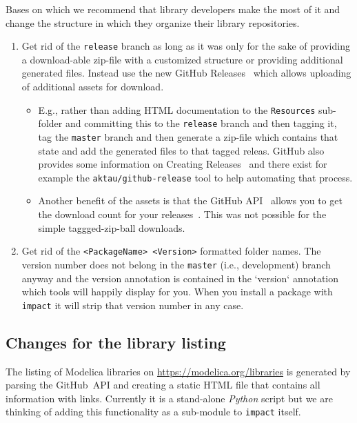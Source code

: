 \documentclass[11pt,a4paper,twocolumn]{article}
\newcommand{\code}[1]{\texttt{#1}} %
\begin{document}
Bases on which we recommend that library developers make the most of
it and change the structure in which they organize their library repositories.
\begin{enumerate}
\item Get rid of the \texttt{release} branch as long as it was only
  for the sake of providing a download-able zip-file with a customized
  structure or providing additional generated files.
  Instead use the new GitHub Releases~\parencite{gh-assets} which
  allows uploading of additional assets for download.
  \begin{itemize}
  \item E.g., rather than adding HTML documentation to the
    \texttt{Resources} sub-folder and committing this to the
    \texttt{release} branch and then tagging it, tag the
    \texttt{master} branch and then generate a zip-file which contains
    that state and add the generated files to that tagged releas.
    GitHub also provides some information on Creating
    Releases~\parencite{gh-releases} and there exist for example the
    \texttt{aktau/github-release}\parencite{aktau-github-release} tool
    to help automating that process.
  \item Another benefit of  the assets is that the GitHub
    API~\parencite{gh-api} allows you to get the download count for
    your releases~\parencite{gh-dl-count}.
    This was not possible for the simple taggged-zip-ball downloads.
  \end{itemize}
\item Get rid of the \texttt{<PackageName> <Version>} formatted folder
  names. The version number does not belong in the  \texttt{master}
  (i.e., development)  branch anyway and the version annotation is
  contained  in the `version` annotation which tools will happily
  display for you. When you install a package with \code{impact} it
  will strip that version number in any case.
\end{enumerate}

\subsection{Changes for the library listing}
The listing of Modelica libraries on
\url{https://modelica.org/libraries} is generated by parsing the
GitHub~API and creating a static HTML file that contains all
information with links. Currently it is a stand-alone \emph{Python}
script but we are thinking of adding this functionality as a
sub-module to \code{impact} itself.
\end{document}
